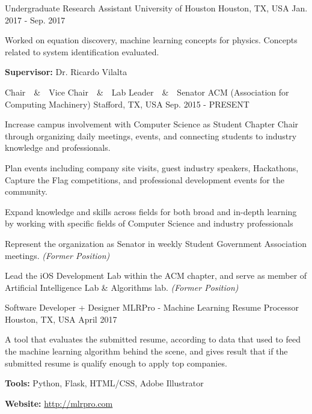 \begin{cventries}
  \cventry
  	{Undergraduate Research Assistant}
    {University of Houston}
    {Houston, TX, USA}
    {Jan. 2017 - Sep. 2017}
    {
      \begin{cvitems}
        \item {Worked on equation discovery, machine learning concepts for physics. Concepts related to system identification evaluated.}
        \item {\textbf{Supervisor:} Dr. Ricardo Vilalta}
      \end{cvitems}
    }
  \cventry
  	{Chair~~\&~~Vice Chair~~\&~~Lab Leader~~\&~~Senator}
    {ACM (Association for Computing Machinery)}
    {Stafford, TX, USA}
    {Sep. 2015 - PRESENT}
    {
      \begin{cvitems}
        \item {Increase campus involvement with Computer Science as Student Chapter Chair through organizing daily meetings, events, and connecting students to industry knowledge and professionals.}
        \item {Plan events including company site visits, guest industry speakers, Hackathons, Capture the Flag competitions, and professional development events for the community.}
        \item {Expand knowledge and skills across fields for both broad and in-depth learning by working with specific fields of
Computer Science and industry professionals}
		\item{Represent the organization as Senator in weekly Student Government Association meetings. \textit{(Former Position)}}
       	\item{ Lead the iOS Development Lab within the ACM chapter, and serve as member of Artificial Intelligence Lab \& Algorithms lab. \textit{(Former Position)}}
      \end{cvitems}
    }
    \cventry
  	{Software Developer + Designer}
    {MLRPro - Machine Learning Resume Processor}
    {Houston, TX, USA}
    {April 2017}
    {
      \begin{cvitems}
        \item {A tool that evaluates the submitted resume, according to data that used to feed the machine learning algorithm behind the scene, and gives result that if the submitted resume is qualify enough to apply top companies.}
        \item {\textbf{Tools:} Python, Flask, HTML/CSS, Adobe Illustrator}
        \item {\textbf{Website:} \href{http://mlrpro.com}{http://mlrpro.com} }

\end{cvitems}}
\end{cventries}
